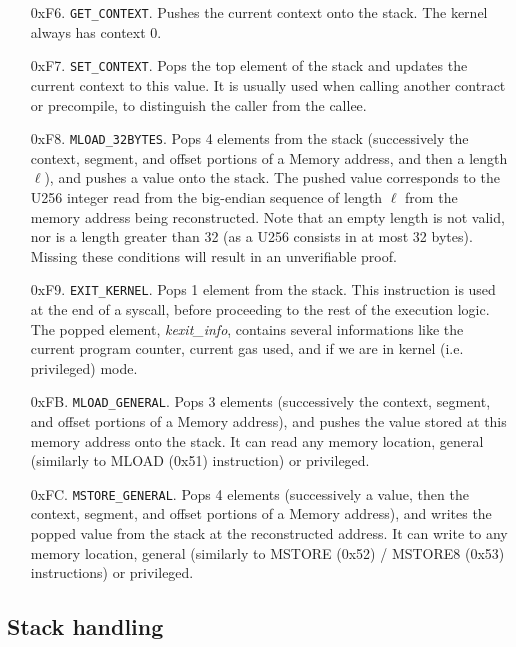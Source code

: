 \begin{enumerate}[align=left]
  \item[0xF6.] \texttt{GET\_CONTEXT}. Pushes the current context onto the stack. The kernel always has context 0.

  \item[0xF7.] \texttt{SET\_CONTEXT}. Pops the top element of the stack and updates the current context to this value. It is usually used when calling another contract or precompile,
  to distinguish the caller from the callee.

  \item[0xF8.] \texttt{MLOAD\_32BYTES}. Pops 4 elements from the stack (successively the context, segment, and offset portions of a Memory address, and then a length $\ell$), and pushes
  a value onto the stack. The pushed value corresponds to the U256 integer read from the big-endian sequence of length $\ell$ from the memory address being reconstructed. Note that an
  empty length is not valid, nor is a length greater than 32 (as a U256 consists in at most 32 bytes). Missing these conditions will result in an unverifiable proof.

  \item[0xF9.] \texttt{EXIT\_KERNEL}. Pops 1 element from the stack. This instruction is used at the end of a syscall, before proceeding to the rest of the execution logic.
  The popped element, \textit{kexit\_info}, contains several informations like the current program counter, current gas used, and if we are in kernel (i.e. privileged) mode.

  \item[0xFB.] \texttt{MLOAD\_GENERAL}. Pops 3 elements (successively the context, segment, and offset portions of a Memory address), and pushes the value stored at this memory
  address onto the stack. It can read any memory location, general (similarly to MLOAD (0x51) instruction) or privileged.

  \item[0xFC.] \texttt{MSTORE\_GENERAL}. Pops 4 elements (successively a value, then the context, segment, and offset portions of a Memory address), and writes the popped value from
  the stack at the reconstructed address. It can write to any memory location, general (similarly to MSTORE (0x52) / MSTORE8 (0x53) instructions) or privileged.

\end{enumerate}


\subsection{Stack handling}

